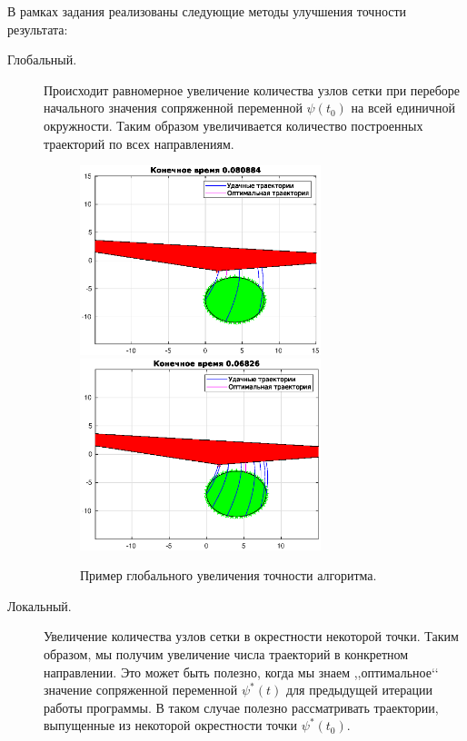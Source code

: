 В рамках задания реализованы следующие методы улучшения точности результата:
\begin{description}
        \item[Глобальный.] Происходит равномерное увеличение количества узлов сетки при переборе начального значения сопряженной переменной $\psi(t_0)$ на всей единичной окружности. Таким образом увеличивается количество построенных траекторий по всех направлениям.
        \begin{figure}[h]
                \hfill
                \includegraphics[width=70mm]{algorithm/glb-imp-1.eps}
                \hfill
                \hfill
                \includegraphics[width=70mm]{algorithm/glb-imp-2.eps}
                \hfill
                \caption{Пример глобального увеличения точности алгоритма.}
        \end{figure}
        \item[Локальный.] Увеличение количества узлов сетки в окрестности некоторой точки. Таким образом, мы получим увеличение числа траекторий в конкретном направлении. Это может быть полезно, когда мы знаем ,,оптимальное‘‘ значение сопряженной переменной $\psi^*(t)$ для предыдущей итерации работы программы. В таком случае полезно рассматривать траектории, выпущенные из некоторой окрестности точки $\psi^*(t_0)$.


\end{description}
